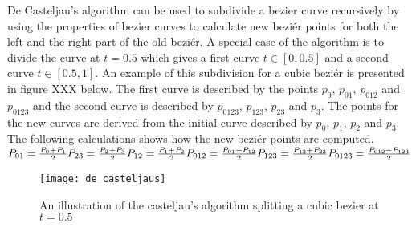 De Casteljau’s algorithm can be used to subdivide a bezier curve recursively by using the properties of bezier curves to calculate new beziér points for both the left and the right part of the old beziér.\citep{fischer2000} A special case of the algorithm is to divide the curve at \begin{math}t=0.5\end{math} which gives a first curve \begin{math}t\in[0, 0.5]\end{math} and a second curve \begin{math}t\in[0.5, 1]\end{math}. An example of this subdivision for a cubic beziér is presented in figure XXX below. The first curve is described by the points \begin{math}p_0\end{math}, \begin{math}p_{01}\end{math}, \begin{math}p_{012}\end{math} and \begin{math}p_{0123}\end{math} and the second curve is described by \begin{math}p_{0123}\end{math}, \begin{math}p_{123}\end{math}, \begin{math}p_{23}\end{math} and \begin{math}p_{3}\end{math}. The points for the new curves are derived from the initial curve described by \begin{math}p_{0}\end{math}, \begin{math}p_{1}\end{math}, \begin{math}p_{2}\end{math} and \begin{math}p_{3}\end{math}. The following calculations shows how the new beziér points are computed.\vspace{\baselineskip}\newline
\begin{math}
	P_{01}=\frac{P_0+P_1}{2}\newline
	P_{23}=\frac{P_2+P_3}{2}\newline
	P_{12}=\frac{P_1+P_2}{2}\newline
	P_{012}=\frac{P_{01}+P_{12}}{2}\newline
	P_{123}=\frac{P_{12}+P_{23}}{2}\newline
	P_{0123}=\frac{P_{012}+P_{123}}{2}
\end{math}\vspace{\baselineskip}\newline
\begin{figure}[H]
\texttt{[image: de\_casteljaus]}
\caption{An illustration of the casteljau's algorithm splitting a cubic bezier at $t=0.5$}
\end{figure}

